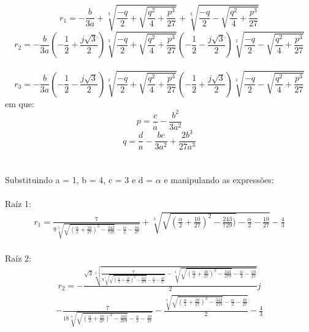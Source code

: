 \documentclass[a4paper,12pt,twoside]{article}
\begin{document}
\begin{equation}
r_{1} = -\frac{b}{3a} +\sqrt[3]{\frac{-q}{2} + \sqrt{\frac{q^2}{4} +\frac{p^3}{27}}} +\sqrt[3]{\frac{-q}{2} -\sqrt{\frac{q^2}{4}+\frac{p^3}{27}}}
\end{equation}
\begin{equation}
r_{2} = -\frac{b}{3a} (-\frac{1}{2} +\frac{j\sqrt{3}}{2})\sqrt[3]{\frac{-q}{2} + \sqrt{\frac{q^2}{4} +\frac{p^3}{27}}} (-\frac{1}{2} -\frac{j\sqrt{3}}{2})\sqrt[3]{\frac{-q}{2} -\sqrt{\frac{q^2}{4}+\frac{p^3}{27}}}
\end{equation}
\\
\begin{equation}
r_{3} = -\frac{b}{3a} (-\frac{1}{2} -\frac{j\sqrt{3}}{2})\sqrt[3]{\frac{-q}{2} + \sqrt{\frac{q^2}{4} +\frac{p^3}{27}}} (-\frac{1}{2} +\frac{j\sqrt{3}}{2})\sqrt[3]{\frac{-q}{2} -\sqrt{\frac{q^2}{4}+\frac{p^3}{27}}}
\end{equation}
em que:
\begin{equation}
p = \frac{c}{a}-\frac{b^2}{3 a^2}\end{equation}
\begin{equation}
q = \frac{d}{a} -\frac{bc}{3a^2} +\frac{2b^3}{27a^3}
\end{equation}
\\
\\
Substituindo a = 1, b = 4, c = 3 e d = $\alpha$ e manipulando as expressões:
\\
\\
Raíz  1: 
\begin{align} \label{r1} 
r_{1} = \frac{7}{9\sqrt[3]{\sqrt{(\frac{\alpha}{2}+\frac{10}{27})^2 -\frac{243}{729}}-\frac{\alpha}{2}-\frac{10}{27}}}+\sqrt[3]{\sqrt{(\frac{\alpha}{2}+\frac{10}{27})^2-\frac{243}{729})}-\frac{\alpha}{2}-\frac{10}{27}}-\frac{4}{3}
\end{align}
\\
Raíz  2:
\begin{align*} \label{r2}
r_{2} = -\frac{\sqrt{3}\sqrt[3]{\frac{7}{9\sqrt[3]{\sqrt{(\frac{\alpha}{2} + \frac{10}{27})^2 - \frac{343}{279}}-\frac{\alpha}{2}-\frac{10}{27}}}-\sqrt[3]{\sqrt{(\frac{\alpha}{2} + \frac{10}{27})^2 - \frac{343}{279}}-\frac{\alpha}{2}-\frac{10}{27}}}}{2}j
\end{align*}
\begin{align} 
-\frac{7}{18\sqrt[3]{\sqrt{(\frac{\alpha}{2} + \frac{10}{27})^2 - \frac{343}{279}}-\frac{\alpha}{2}-\frac{10}{27}}}-\frac{ \sqrt[3]{\sqrt{(\frac{\alpha}{2} + \frac{10}{27})^2 - \frac{343}{279}}-\frac{\alpha}{2}-\frac{10}{27}}  }{2}-\frac{4}{3}
 \end{align}
\end{document}
